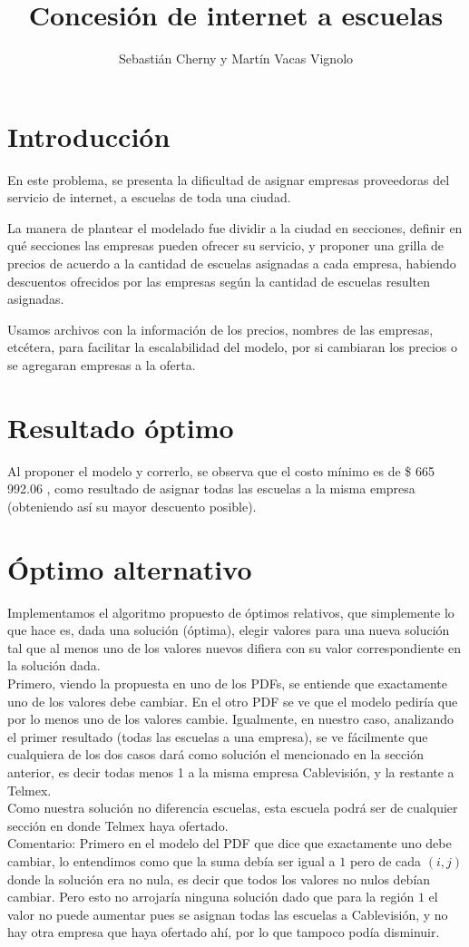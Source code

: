 \documentclass{article}
\title{Concesión de internet a escuelas}
\author{Sebastián Cherny y Martín Vacas Vignolo }
\begin{document}
\maketitle

\section{Introducción}

En este problema, se presenta la dificultad de asignar empresas proveedoras del servicio de internet, a escuelas de toda una ciudad.

La manera de plantear el modelado fue dividir a la ciudad en secciones, definir en qué secciones las empresas pueden ofrecer su servicio, y proponer una grilla de precios de acuerdo a la cantidad de escuelas asignadas a cada empresa, habiendo descuentos ofrecidos por las empresas según la cantidad de escuelas resulten asignadas.

Usamos archivos con la información de los precios, nombres de las empresas, etcétera, para facilitar la escalabilidad del modelo, por si cambiaran los precios o se agregaran empresas a la oferta.

\section{Resultado óptimo}
Al proponer el modelo y correrlo, se observa que el costo mínimo es de \$ 665 992.06 , como resultado de asignar todas las escuelas a la misma empresa (obteniendo así su mayor descuento posible).


\section{Óptimo alternativo}
Implementamos el algoritmo propuesto de óptimos relativos, que simplemente lo que hace es, dada una solución (óptima), elegir valores para una nueva solución tal que al menos uno de los valores nuevos difiera con su valor correspondiente en la solución dada.\\
Primero, viendo la propuesta en uno de los PDFs, se entiende que exactamente uno de los valores debe cambiar. En el otro PDF se ve que el modelo pediría que por lo menos uno de los valores cambie. Igualmente, en nuestro caso, analizando el primer resultado (todas las escuelas a una empresa), se ve fácilmente que cualquiera de los dos casos dará como solución el mencionado en la sección anterior, es decir todas menos 1 a la misma empresa Cablevisión, y la restante a Telmex.\\
Como nuestra solución no diferencia escuelas, esta escuela podrá ser de cualquier sección en donde Telmex haya ofertado.\\
Comentario: Primero en el modelo del PDF que dice que exactamente uno debe cambiar, lo entendimos como que la suma debía ser igual a $1$ pero de cada $(i,j)$ donde la solución era no nula, es decir que todos los valores no nulos debían cambiar. Pero esto no arrojaría ninguna solución dado que para la región $1$ el valor no puede aumentar pues se asignan todas las escuelas a Cablevisión, y no hay otra empresa que haya ofertado ahí, por lo que tampoco podía disminuir.
\end{document}
